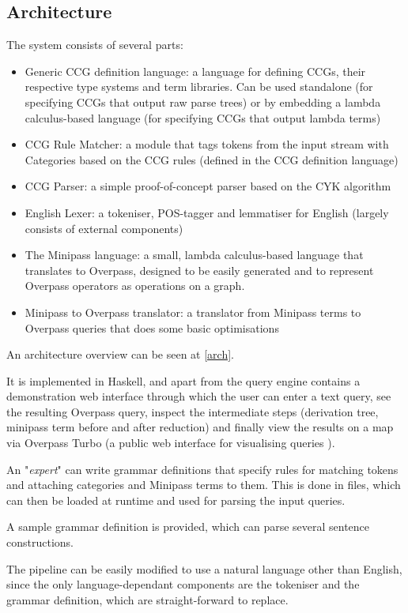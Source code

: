 \documentclass[main.tex]{subfiles}
\begin{document}
\subsection{Architecture}
The system consists of several parts:


\begin{itemize}
    \item Generic CCG definition language: a language for defining CCGs,
          their respective type systems and term libraries. Can be used
          standalone (for specifying CCGs that output raw parse trees)
          or by embedding a lambda calculus-based language (for specifying
          CCGs that output lambda terms)

    \item CCG Rule Matcher: a module that tags tokens from the input stream
          with Categories based on the CCG rules (defined in the CCG definition
          language)

    \item CCG Parser: a simple proof-of-concept parser based on the CYK
          algorithm

    \item English Lexer: a tokeniser, POS-tagger and lemmatiser for English
          (largely consists of external components)

    \item The Minipass language: a small, lambda calculus-based language
          that translates to Overpass, designed to be easily generated and
          to represent Overpass operators as operations on a graph.

    \item Minipass to Overpass translator: a translator from Minipass terms
          to Overpass queries that does some basic optimisations
\end{itemize}

An architecture overview can be seen at \cref{arch}.

It is implemented in Haskell, and apart from the query engine contains
a demonstration web interface through which the user can enter a text query,
see the resulting Overpass query, inspect the intermediate steps (derivation
tree, minipass term before and after reduction) and finally view the results
on a map via Overpass Turbo (a public web interface for visualising queries
\cite{overpassturbo}).

An "\emph{expert}" can write grammar definitions that specify rules for matching
tokens and attaching categories and Minipass terms to them. This is done in
 files, which can then be loaded at runtime and used for parsing the
input queries.

A sample grammar definition is provided, which can parse several sentence
constructions.

The pipeline can be easily modified to use a natural language other than
English, since the only language-dependant components are the tokeniser and
the grammar definition, which are straight-forward to replace.
\end{document}
